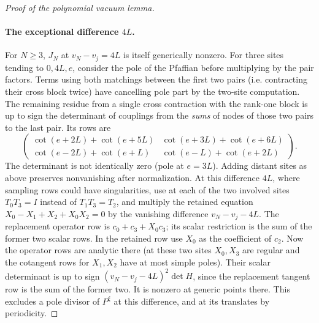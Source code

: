 \begin{proof}[Proof of the polynomial vacuum lemma]
\paragraph{The exceptional difference \(4L\).}
For \(N\ge3\), \(J_N\) at \(v_N-v_j=4L\) is itself generically nonzero. For three sites tending to \(0,4L,e\), consider the pole of the Pfaffian before multiplying by the pair factors. Terms using both matchings between the first two pairs (i.e. contracting their cross block twice) have cancelling pole part by the two-site computation. The remaining residue from a single cross contraction with the rank-one block is up to sign the determinant of couplings from the \emph{sums} of nodes of those two pairs to the last pair. Its rows are
\[
 \begin{pmatrix}
 \cot(e+2L)+\cot(e+5L)&\cot(e+3L)+\cot(e+6L)\\
 \cot(e-2L)+\cot(e+L)&\cot(e-L)+\cot(e+2L)
 \end{pmatrix}.
\]
The determinant is not identically zero (pole at \(e=3L\)). Adding distant sites as above preserves nonvanishing after normalization. At this difference \(4L\), where sampling rows could have singularities, use at each of the two involved sites \(T_0T_3=I\) instead of \(T_1T_3=T_2\), and multiply the retained equation \(X_0-X_1+X_2+X_0X_2=0\) by the vanishing difference \(v_N-v_j-4L\). The replacement operator row is \(c_0+c_3+X_0c_3\); its scalar restriction is the sum of the former two scalar rows. In the retained row use \(X_0\) as the coefficient of \(c_2\). Now the operator rows are analytic there (at these two sites \(X_0,X_3\) are regular and the cotangent rows for \(X_1,X_2\) have at most simple poles). Their scalar determinant is up to sign \((v_N-v_j-4L)^2\det H\), since the replacement tangent row is the sum of the former two. It is nonzero at generic points there. This excludes a pole divisor of \(P^\xi\) at this difference, and at its translates by periodicity.


\end{proof}
